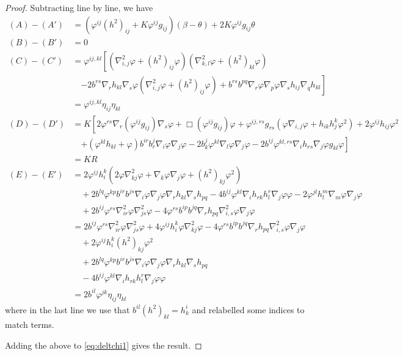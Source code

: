 \documentclass{amsart}
\begin{document}
\begin{proof}
Subtracting line by line, we have
\begin{align*}
(A) - (A') &= (\varphi^{ij}(h^2)_{ij} +  K\varphi^{ij}g_{ij})(\beta - \theta) + 2 K \varphi^{ij}g_{ij} \theta \\
(B) - (B') &= 0 \\
(C) - (C') &= \varphi^{ij,kl} \left[(\nabla^2_{i,j}\varphi + (h^2)_{ij}\varphi) (\nabla^2_{k,l} \varphi + (h^2)_{kl}\varphi) \right. \\
& \quad \left. - 2b^{rs} \nabla_r h_{kl}\nabla_s\varphi (\nabla^2_{i,j} \varphi + (h^2)_{ij}\varphi) + b^{rs}b^{pq}\nabla_r \varphi\nabla_p\varphi \nabla_s h_{ij} \nabla_q h_{kl}\right] \\
&= \varphi^{ij,kl} \eta_{ij} \eta_{kl} \\
(D) - (D') &= K\left[2\varphi^{rs} \nabla_r (\varphi^{ij}g_{ij}) \nabla_s \varphi + \Box (\varphi^{ij}g_{ij}) \varphi + \varphi^{ij,rs}g_{rs} (\varphi\nabla_{i,j}\varphi + h_{ik}h^{k}_{j}\varphi^{2}) + 2\varphi^{ij}h_{ij}\varphi^{2}\right. \\
&\quad \left. + (\varphi^{kl}h_{kl} + \varphi)b^{ir}b^{j}_{r}\nabla_i \varphi\nabla_j\varphi - 2 b^{j}_{k}\varphi^{kl}\nabla_l\varphi\nabla_j\varphi - 2 b^{ij}\varphi^{kl,rs}\nabla_i h_{rs}\nabla_j\varphi g_{kl}\varphi\right] \\
&= KR \\
(E) - (E') &= 2\varphi^{ij}h^{k}_{i} (2\varphi\nabla^2_{kj}\varphi + \nabla_k \varphi \nabla_j \varphi + (h^2)_{kj}\varphi^{2}) \\
&\quad + 2b^{lq}\varphi^{kp} b^{ir}b^{js}\nabla_i \varphi\nabla_j\varphi \nabla_r h_{kl} \nabla_s h_{pq} - 4b^{ij}\varphi^{kl}\nabla_i h_{rk}h^{r}_{l}\nabla_j \varphi\varphi - 2\varphi^{jl}h^{m}_{l}\nabla_m\varphi\nabla_j\varphi \\
&\quad + 2b^{ij}\varphi^{rs}\nabla^2_{ir}\varphi\nabla^2_{js}\varphi - 4\varphi^{rs}b^{ip}b^{jq}\nabla_r h_{pq}\nabla^2_{i,s} \varphi \nabla_j\varphi \\
&= 2b^{ij}\varphi^{rs}\nabla^2_{ir}\varphi\nabla^2_{js}\varphi + 4\varphi^{ij}h^{k}_{i} \varphi\nabla^2_{kj}\varphi - 4\varphi^{rs}b^{ip}b^{jq}\nabla_r h_{pq}\nabla^2_{i,s} \varphi \nabla_j\varphi \\
&\quad +2\varphi^{ij}h^{k}_{i} (h^2)_{kj}\varphi^{2} \\
&\quad + 2b^{lq}\varphi^{kp} b^{ir}b^{js}\nabla_i \varphi\nabla_j\varphi \nabla_r h_{kl} \nabla_s h_{pq} \\
&\quad - 4b^{ij}\varphi^{kl}\nabla_i h_{rk}h^{r}_{l}\nabla_j \varphi\varphi \\
&= 2b^{il} \varphi^{jk}\eta_{ij}\eta_{kl}
\end{align*}
where in the last line we use that \(b^{il}(h^2)_{kl} = h^i_k\) and relabelled some indices to match terms.

Adding the above to \cref{eq:deltchi1} gives the result.
\end{proof}
	




\end{document}
